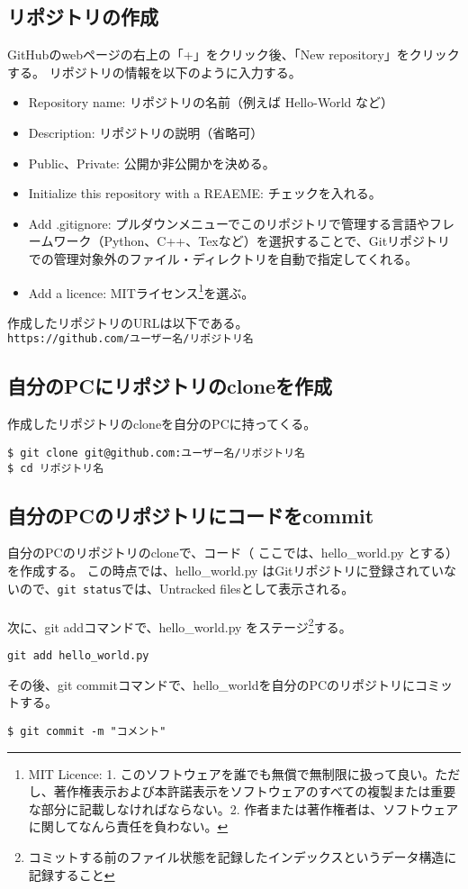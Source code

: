 \documentclass[11pt, oneside]{article}   	%
\begin{document}
\subsection{リポジトリの作成}
GitHubのwebページの右上の「+」をクリック後、「New repository」をクリックする。
リポジトリの情報を以下のように入力する。
\begin{itemize}
\item Repository name: リポジトリの名前（例えば Hello-World など）
\item Description: リポジトリの説明（省略可）
\item Public、Private: 公開か非公開かを決める。
\item Initialize this repository with a REAEME: チェックを入れる。
\item Add .gitignore: プルダウンメニューでこのリポジトリで管理する言語やフレームワーク（Python、C++、Texなど）を選択することで、Gitリポジトリでの管理対象外のファイル・ディレクトリを自動で指定してくれる。
\item Add a licence: MITライセンス\footnote{MIT Licence: 1. このソフトウェアを誰でも無償で無制限に扱って良い。ただし、著作権表示および本許諾表示をソフトウェアのすべての複製または重要な部分に記載しなければならない。2. 作者または著作権者は、ソフトウェアに関してなんら責任を負わない。}を選ぶ。
\end{itemize}
作成したリポジトリのURLは以下である。\\
\verb|https://github.com/ユーザー名/リポジトリ名|\\

\subsection{自分のPCにリポジトリのcloneを作成}
作成したリポジトリのcloneを自分のPCに持ってくる。
\begin{lstlisting}
$ git clone git@github.com:ユーザー名/リポジトリ名
$ cd リポジトリ名
\end{lstlisting}

\subsection{自分のPCのリポジトリにコードをcommit}
自分のPCのリポジトリのcloneで、コード（ ここでは、hello\_world.py とする）を作成する。
この時点では、hello\_world.py はGitリポジトリに登録されていないので、\verb|git status|では、Untracked filesとして表示される。\\
　\\
次に、git addコマンドで、hello\_world.py をステージ\footnote{コミットする前のファイル状態を記録したインデックスというデータ構造に記録すること}する。
\begin{lstlisting}
git add hello_world.py
\end{lstlisting}
その後、git commitコマンドで、hello\_worldを自分のPCのリポジトリにコミットする。
\begin{lstlisting}
$ git commit -m "コメント"
\end{lstlisting}
\end{document}
